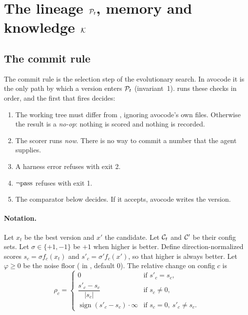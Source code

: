 \section{The lineage \texorpdfstring{$\mathcal{P}_t$}{P\_t}, memory and knowledge \texorpdfstring{$\mathcal{K}$}{K}}
\label{sec:lineage}

\subsection{The commit rule}
\label{sec:commit-rule}

The commit rule is the selection step of the evolutionary search. In avocode it is the only path by
which a version enters $\mathcal{P}_t$ (invariant~1).  runs these checks in order, and the first
that fires decides:
\begin{enumerate}[leftmargin=*,itemsep=1pt]
  \item The working tree must differ from , ignoring avocode's own files. Otherwise the
    result is a \emph{no-op}: nothing is scored and nothing is recorded.
  \item The scorer runs \emph{now}. There is no way to commit a number that the agent supplies.
  \item A harness error refuses with exit 2.
  \item $\neg\mathrm{pass}$ refuses with exit 1.
  \item The comparator below decides. If it accepts, avocode writes the version.
\end{enumerate}

\paragraph{Notation.} Let $x_t$ be the best version and $x'$ the candidate. Let $\mathcal{C}_t$ and
$\mathcal{C}'$ be their config sets. Let $\sigma \in \{+1, -1\}$ be $+1$ when higher is better. Define
direction-normalized scores $s_c = \sigma f_c(x_t)$ and $s'_c = \sigma' f_c(x')$, so that higher is
always better. Let $\varphi \geq 0$ be the noise floor ( in ,
default 0). The relative change on config $c$ is
\begin{equation}
  \rho_c =
  \begin{cases}
    0 & \text{if } s'_c = s_c,\\[2pt]
    \dfrac{s'_c - s_c}{|s_c|} & \text{if } s_c \neq 0,\\[6pt]
    \operatorname{sign}(s'_c - s_c)\cdot\infty & \text{if } s_c = 0,\ s'_c \neq s_c.
  \end{cases}
  \label{eq:rho}
\end{equation}

